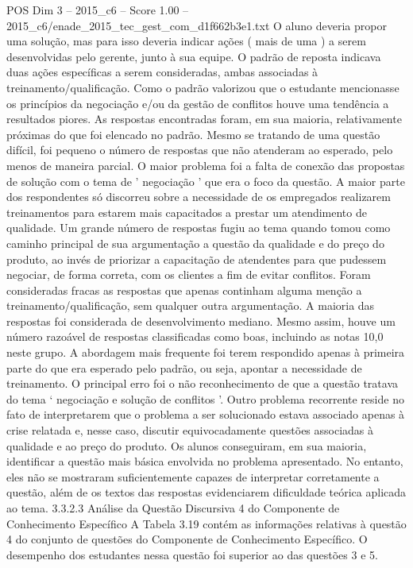 \begin{textsample}{POS Dim 3 – 2015\_c6 – Score 1.00 – 2015\_c6/enade\_2015\_tec\_gest\_com\_d1f662b3e1.txt}
O aluno deveria propor uma solução, mas para isso deveria indicar ações ( mais de uma ) a serem desenvolvidas pelo gerente, junto à sua equipe.
O padrão de reposta indicava duas ações específicas a serem consideradas, ambas associadas à treinamento/qualificação.
Como o padrão valorizou que o estudante mencionasse os princípios da negociação e/ou da gestão de conflitos houve uma tendência a resultados piores.
As respostas encontradas foram, em sua maioria, relativamente próximas do que foi elencado no padrão.
Mesmo se tratando de uma questão difícil, foi pequeno o número de respostas que não atenderam ao esperado, pelo menos de maneira parcial.
O maior problema foi a falta de conexão das propostas de solução com o tema de ' negociação ' que era o foco da questão.
A maior parte dos respondentes só discorreu sobre a necessidade de os empregados realizarem treinamentos para estarem mais capacitados a prestar um atendimento de qualidade.
Um grande número de respostas fugiu ao tema quando tomou como caminho principal de sua argumentação a questão da qualidade e do preço do produto, ao invés de priorizar a capacitação de atendentes para que pudessem negociar, de forma correta, com os clientes a fim de evitar conflitos.
Foram consideradas fracas as respostas que apenas continham alguma menção a treinamento/qualificação, sem qualquer outra argumentação.
A maioria das respostas foi considerada de desenvolvimento mediano.
Mesmo assim, houve um número razoável de respostas classificadas como boas, incluindo as notas 10,0 neste grupo.
A abordagem mais frequente foi terem respondido apenas à primeira parte do que era esperado pelo padrão, ou seja, apontar a necessidade de treinamento.
O principal erro foi o não reconhecimento de que a questão tratava do tema ‘ negociação e solução de conflitos ’.
Outro problema recorrente reside no fato de interpretarem que o problema a ser solucionado estava associado apenas à crise relatada e, nesse caso, discutir equivocadamente questões associadas à qualidade e ao preço do produto.
Os alunos conseguiram, em sua maioria, identificar a questão mais básica envolvida no problema apresentado.
No entanto, eles não se mostraram suficientemente capazes de interpretar corretamente a questão, além de os textos das respostas evidenciarem dificuldade teórica aplicada ao tema. 3.3.2.3 Análise da Questão Discursiva 4 do Componente de Conhecimento Específico A Tabela 3.19 contém as informações relativas à questão 4 do conjunto de questões do Componente de Conhecimento Específico.
O desempenho dos estudantes nessa questão foi superior ao das questões 3 e 5.

\end{textsample}
